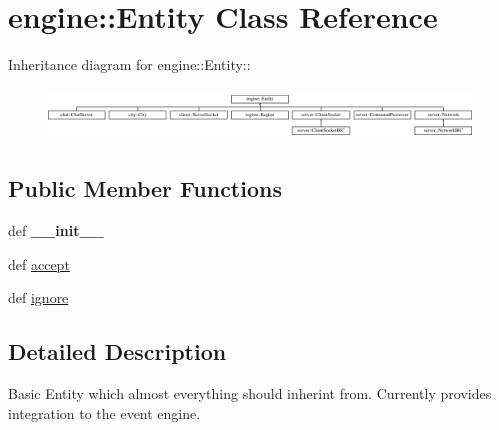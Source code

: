 \hypertarget{classengine_1_1Entity}{
\section{engine::Entity Class Reference}
\label{classengine_1_1Entity}
}
Inheritance diagram for engine::Entity::\begin{figure}[H]
\begin{center}
\leavevmode
\includegraphics[height=1.36364cm]{classengine_1_1Entity}
\end{center}
\end{figure}
\subsection*{Public Member Functions}
\begin{DoxyCompactItemize}
\item 
\hypertarget{classengine_1_1Entity_ad9b44f0944d13d8133b56e34edf93d20}{
def {\bfseries \_\-\_\-init\_\-\_\-}}
\label{classengine_1_1Entity_ad9b44f0944d13d8133b56e34edf93d20}

\item 
def \hyperlink{classengine_1_1Entity_ac78a90d44e6f52363a45fe9775611ba4}{accept}
\item 
def \hyperlink{classengine_1_1Entity_aa621f5f2bf52c66dafd8406978e0c11b}{ignore}
\end{DoxyCompactItemize}


\subsection{Detailed Description}
\begin{DoxyVerb}
Basic Entity which almost everything should inherint from.  Currently provides integration to the event engine.
\end{DoxyVerb}
 

